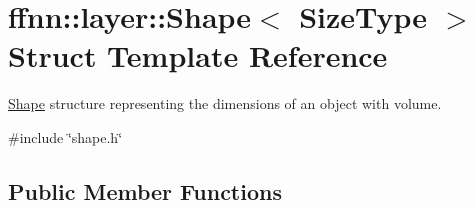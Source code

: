 \hypertarget{structffnn_1_1layer_1_1_shape}{\section{ffnn\-:\-:layer\-:\-:Shape$<$ Size\-Type $>$ Struct Template Reference}
\label{structffnn_1_1layer_1_1_shape}
}


\hyperlink{structffnn_1_1layer_1_1_shape}{Shape} structure representing the dimensions of an object with volume.  




{\ttfamily \#include \char`\"{}shape.\-h\char`\"{}}

\subsection*{Public Member Functions}
